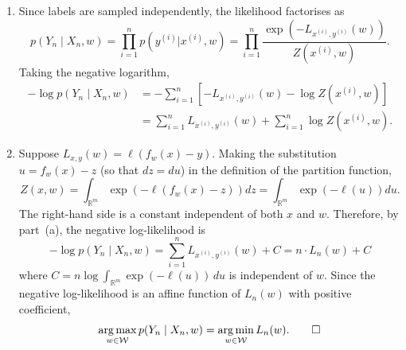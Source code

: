 \documentclass[11pt]{article}
\newcommand{\R}{\mathbb{R}}
\DeclareMathOperator*{\argmin}{arg\,min}
\DeclareMathOperator*{\argmax}{arg\,max}
\newcommand{\W}{\mathcal{W}}
\begin{document}
\begin{solution}
\begin{enumerate}
    \item
        Since labels are sampled independently, the likelihood factorises as
        \begin{equation*}
            p(Y_n \mid X_n, w)
            = \prod_{i=1}^n p(y^{(i)} | x^{(i)}, w)
            = \prod_{i=1}^n
                \frac
                    {\exp\!\left(-L_{x^{(i)},y^{(i)}}(w)\right)}
                    {Z(x^{(i)}, w)}.
        \end{equation*}
        Taking the negative logarithm,
        \begin{align*}
            -\log p(Y_n \mid X_n, w)
            &= -\sum_{i=1}^n \left[
                -L_{x^{(i)},y^{(i)}}(w) - \log Z(x^{(i)}, w)
            \right]
            \\
            &= \sum_{i=1}^n L_{x^{(i)},y^{(i)}}(w)
                + \sum_{i=1}^n \log Z(x^{(i)}, w).
        \end{align*}

    \item
        Suppose $L_{x,y}(w) = \ell(f_w(x) - y)$. Making the substitution
        $u = f_w(x) - z$ (so that $dz = du$) in the definition of the
        partition function,
        \begin{equation*}
            Z(x, w)
            = \int_{\R^m} \exp\!\left(-\ell(f_w(x) - z)\right) dz
            = \int_{\R^m} \exp\!\left(-\ell(u)\right) du.
        \end{equation*}
        The right-hand side is a constant independent of both $x$ and $w$.
        Therefore, by part~(a), the negative log-likelihood is
        \begin{equation*}
            -\log p(Y_n \mid X_n, w)
            = \sum_{i=1}^n L_{x^{(i)},y^{(i)}}(w) + C
            = n \cdot L_n(w) + C
        \end{equation*}
        where $C = n \log \int_{\R^m} \exp(-\ell(u))\,du$ is independent of
        $w$. Since the negative log-likelihood is an affine function of
        $L_n(w)$ with positive coefficient,
        \begin{equation*}
            \argmax_{w\in\W} p(Y_n \mid X_n, w)
            = \argmin_{w\in\W} L_n(w). \qedhere
        \end{equation*}
\end{enumerate}
\end{solution}
\end{document}
